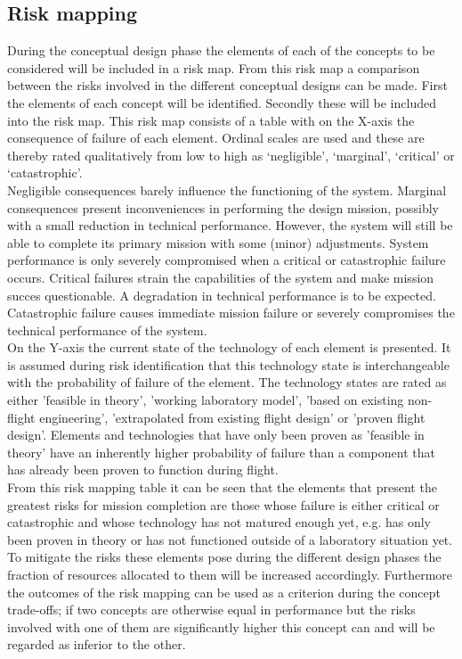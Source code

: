 \subsection{Risk mapping}
\label{subsec:riskmap}
During the conceptual design phase the elements of each of the concepts to be considered will be included in a risk map. From this risk map a comparison between the risks involved in the different conceptual designs can be made. First the elements of each concept will be identified. Secondly these will be included into the risk map. This risk map consists of a table with on the X-axis the consequence of failure of each element. Ordinal scales are used and these are thereby rated qualitatively from low to high as `negligible', `marginal', `critical' or `catastrophic'. \\
\noindent Negligible consequences barely influence the functioning of the system. Marginal consequences present inconveniences in performing the design mission, possibly with a small reduction in technical performance. However, the system will still be able to complete its primary mission with some (minor) adjustments. System performance is only severely compromised when a critical or catastrophic failure occurs. Critical failures strain the capabilities of the system and make mission succes questionable. A degradation in technical performance is to be expected. Catastrophic failure causes immediate mission failure or severely compromises the technical performance of the system. \\
\noindent On the Y-axis the current state of the technology of each element is presented. It is assumed during risk identification that this technology state is interchangeable with the probability of failure of the element. The technology states are rated as either 'feasible in theory', 'working laboratory model', 'based on existing non-flight engineering', 'extrapolated from existing flight design' or 'proven flight design'. Elements and technologies that have only been proven as 'feasible in theory' have an inherently higher probability of failure than a component that has already been proven to function during flight. \\
\noindent From this risk mapping table it can be seen that the elements that present the greatest risks for mission completion are those whose failure is either critical or catastrophic and whose technology has not matured enough yet, e.g. has only been proven in theory or has not functioned outside of a laboratory situation yet. To mitigate the risks these elements pose during the different design phases the fraction of resources allocated to them will be increased accordingly.
Furthermore the outcomes of the risk mapping can be used as a criterion during the concept trade-offs; if two concepts are otherwise equal in performance but the risks involved with one of them are significantly higher this concept can and will be regarded as inferior to the other.

